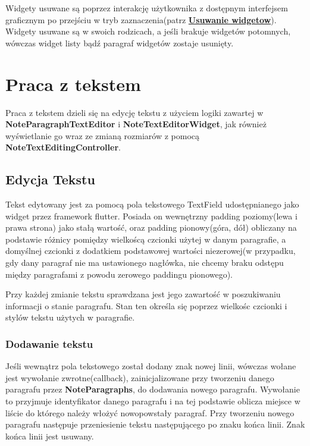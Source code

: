 Widgety usuwane są poprzez interakcję użytkownika z dostępnym interfejsem graficznym po przejściu w tryb zaznaczenia(patrz \hyperref[sub:usuwanieWidgetow]{\textbf{Usuwanie widgetow}}). Widgety usuwane są w swoich rodzicach, a jeśli brakuje widgetów potomnych, wówczas widget listy bądź paragraf widgetów zostaje usunięty.

\section{Praca z tekstem}

Praca z tekstem dzieli się na edycję tekstu z użyciem logiki zawartej w \textbf{NoteParagraphTextEditor} i \textbf{NoteTextEditorWidget}, jak również wyświetlanie go wraz ze zmianą rozmiarów z pomocą \textbf{NoteTextEditingController}.

\subsection{Edycja Tekstu}

Tekst edytowany jest za pomocą pola tekstowego TextField udostępnianego jako widget przez framework flutter. Posiada on wewnętrzny padding poziomy(lewa i prawa strona) jako stałą wartość, oraz padding pionowy(góra, dół) obliczany na podstawie różnicy pomiędzy wielkoścą czcionki użytej w danym paragrafie, a domyślnej czcionki z dodatkiem podstawowej wartości niezerowej(w przypadku, gdy dany paragraf nie ma ustawionego nagłówka, nie chcemy braku odstępu między paragrafami z powodu zerowego paddingu pionowego).

Przy każdej zmianie tekstu sprawdzana jest jego zawartość w poszukiwaniu informacji o stanie paragrafu. Stan ten określa się poprzez wielkośc czcionki i stylów tekstu użytych w paragrafie.

\subsubsection{Dodawanie tekstu}

Jeśli wewnątrz pola tekstowego został dodany znak nowej linii, wówczas wołane jest wywołanie zwrotne(callback), zainicjalizowane przy tworzeniu danego paragrafu przez \textbf{NoteParagraphs}, do dodawania nowego paragrafu. Wywołanie to przyjmuje identyfikator danego paragrafu i na tej podstawie oblicza miejsce w liście do którego należy włożyć nowopowstały paragraf. Przy tworzeniu nowego paragrafu następuje przeniesienie tekstu następującego po znaku końca linii. Znak końca linii jest usuwany.

